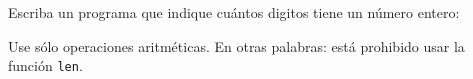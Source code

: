 Escriba un programa que indique
cuántos digitos tiene un número entero:

\begin{minipage}[t]{.20\textwidth}
  
\end{minipage}

Use sólo operaciones aritméticas.
En otras palabras:
está prohibido usar la función \lstinline!len!.


